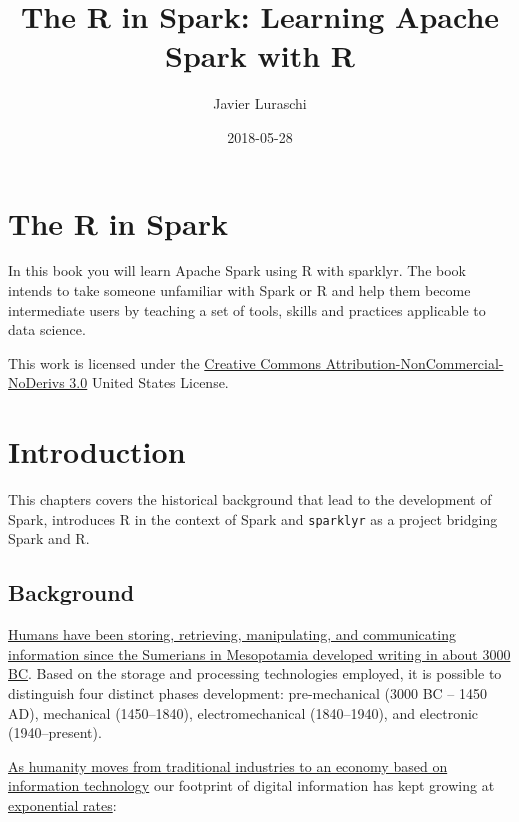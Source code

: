 \documentclass[]{book}
\title{The R in Spark: Learning Apache Spark with R}
\author{Javier Luraschi}
\date{2018-05-28}
\theoremstyle{definition}
\theoremstyle{definition}
\theoremstyle{definition}
\theoremstyle{remark}
\begin{document}
\maketitle

{
\setcounter{tocdepth}{1}
\tableofcontents
}
\hypertarget{the-r-in-spark}{%
\chapter*{The R in Spark}\label{the-r-in-spark}}

In this book you will learn Apache Spark using R with sparklyr. The book
intends to take someone unfamiliar with Spark or R and help them become
intermediate users by teaching a set of tools, skills and practices
applicable to data science.

This work is licensed under the
\href{http://creativecommons.org/licenses/by-nc-nd/3.0/us/}{Creative
Commons Attribution-NonCommercial-NoDerivs 3.0} United States License.

\hypertarget{intro}{%
\chapter{Introduction}\label{intro}}

This chapters covers the historical background that lead to the
development of Spark, introduces R in the context of Spark and
\texttt{sparklyr} as a project bridging Spark and R.

\hypertarget{background}{%
\section{Background}\label{background}}

\href{https://en.wikipedia.org/wiki/Information_technology}{Humans have
been storing, retrieving, manipulating, and communicating information
since the Sumerians in Mesopotamia developed writing in about 3000 BC}.
Based on the storage and processing technologies employed, it is
possible to distinguish four distinct phases development: pre-mechanical
(3000 BC -- 1450 AD), mechanical (1450--1840), electromechanical
(1840--1940), and electronic (1940--present).

\href{https://en.wikipedia.org/wiki/Information_Age}{As humanity moves
from traditional industries to an economy based on information
technology} our footprint of digital information has kept growing at
\href{http://documents.worldbank.org/curated/en/896971468194972881/310436360_201602630200201/additional/102725-PUB-Replacement-PUBLIC.pdf}{exponential
rates}:
\end{document}
